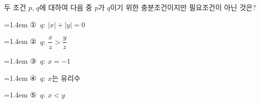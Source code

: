 두 조건 $p$, $q$에 대하여 다음 중 $p$가 $q$이기 위한 충분조건이지만 필요조건이 아닌 것은? 
\par\medskip\par\noindent\hangindent=1.4em {\small ①}\ $q:\ |x|+|y|=0$\par\noindent\hangindent=1.4em {\small ②}\ $q:\ \dfrac{x}{z}>\dfrac{y}{z}$\par\noindent\hangindent=1.4em {\small ③}\ $q:\ x=-1$\par\noindent\hangindent=1.4em {\small ④}\ $q:\ x$는 유리수\par\noindent\hangindent=1.4em {\small ⑤}\ $q:\ x<y$\par\medskip
